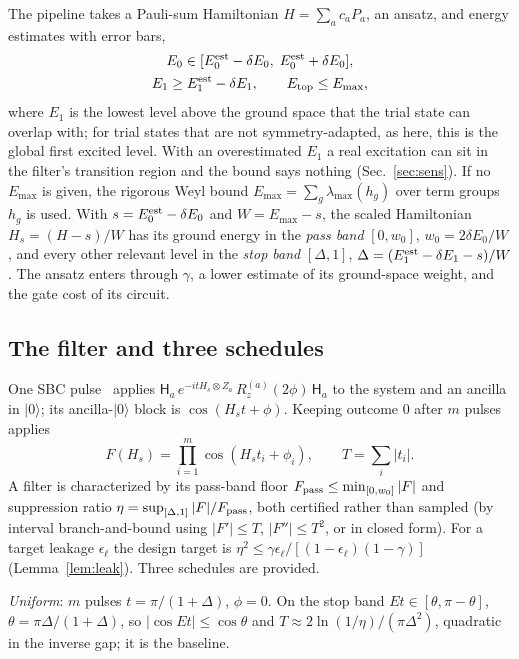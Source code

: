 \documentclass[aps,pra,twocolumn,superscriptaddress,nofootinbib]{revtex4-2}
\newcommand{\ket}[1]{|#1\rangle}
\begin{document}
The pipeline takes a Pauli-sum Hamiltonian $H=\sum_ac_aP_a$, an ansatz, and energy estimates with error bars,
\begin{equation}
\begin{gathered}
E_0\in[E_0^{\rm est}-\delta E_0,\;E_0^{\rm est}+\delta E_0],\\
E_1\ge E_1^{\rm est}-\delta E_1,\qquad E_{\rm top}\le E_{\max},
\end{gathered}
\label{eq:assumptions}
\end{equation}
where $E_1$ is the lowest level above the ground space that the trial state can overlap with; for trial states
that are not symmetry-adapted, as here, this is the global first excited level. With an overestimated $E_1$ a
real excitation can sit in the filter's transition region and the bound says nothing (Sec.~\ref{sec:sens}). If
no $E_{\max}$ is given, the rigorous Weyl bound $E_{\max}=\sum_g\lambda_{\max}(h_g)$ over term groups $h_g$ is
used. With $s=E_0^{\rm est}-\delta E_0$ and $W=E_{\max}-s$, the scaled Hamiltonian $H_s=(H-s)/W$ has its ground
energy in the \emph{pass band} $[0,w_0]$, $w_0=2\delta E_0/W$, and every other relevant level in the
\emph{stop band} $[\Delta,1]$, $\Delta=(E_1^{\rm est}-\delta E_1-s)/W$. The ansatz enters through $\gamma$, a
lower estimate of its ground-space weight, and the gate cost of its circuit.

\subsection{The filter and three schedules}

One SBC pulse~\cite{Stetcu2023} applies $\mathsf H_a\,e^{-itH_s\otimes Z_a}\,R_z^{(a)}(2\phi)\,\mathsf H_a$
to the system and an ancilla in $\ket0$; its ancilla-$\ket0$ block is $\cos(H_st+\phi)$. Keeping outcome 0
after $m$ pulses applies
\begin{equation}
F(H_s)=\prod_{i=1}^m\cos(H_st_i+\phi_i),\qquad T=\sum_i|t_i|.
\end{equation}
A filter is characterized by its pass-band floor $F_{\rm pass}\le\min_{[0,w_0]}|F|$ and suppression ratio
$\eta=\sup_{[\Delta,1]}|F|/F_{\rm pass}$, both certified rather than sampled (by interval branch-and-bound
using $|F'|\le T$, $|F''|\le T^2$, or in closed form). For a target leakage $\epsilon_\ell$ the design target is
$\eta^2\le\gamma\epsilon_\ell/[(1-\epsilon_\ell)(1-\gamma)]$ (Lemma~\ref{lem:leak}). Three schedules are
provided.

\emph{Uniform}: $m$ pulses $t=\pi/(1+\Delta)$, $\phi=0$. On the stop band $Et\in[\theta,\pi-\theta]$,
$\theta=\pi\Delta/(1+\Delta)$, so $|\cos Et|\le\cos\theta$ and $T\approx2\ln(1/\eta)/(\pi\Delta^2)$, quadratic in
the inverse gap; it is the baseline.
\end{document}
